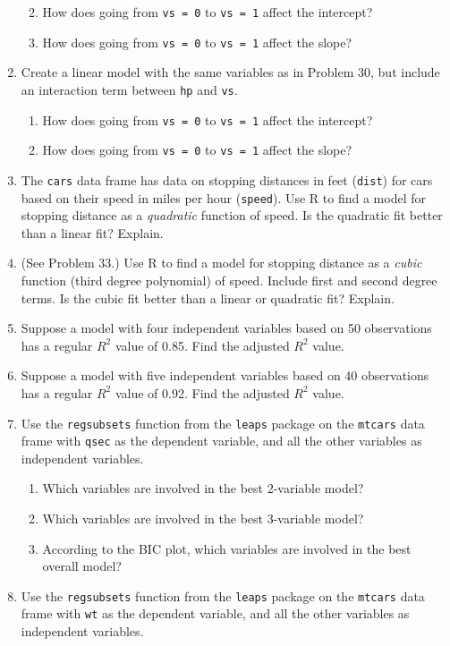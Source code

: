 \documentclass[
]{book}
\providecommand{\tightlist}{%
  \setlength{\itemsep}{0pt}\setlength{\parskip}{0pt}}
\theoremstyle{definition}
\theoremstyle{definition}
\theoremstyle{definition}
\theoremstyle{definition}
\theoremstyle{remark}
\begin{document}
\begin{enumerate}
  \begin{enumerate}
  \def\labelenumii{\alph{enumii}.}
  \tightlist
  \item
    How does going from \texttt{vs\ =\ 0} to \texttt{vs\ =\ 1} affect the intercept?
  \item
    How does going from \texttt{vs\ =\ 0} to \texttt{vs\ =\ 1} affect the slope?
  \end{enumerate}
\item
  Create a linear model with the same variables as in Problem 30, but include an interaction term between \texttt{hp} and \texttt{vs}.

  \begin{enumerate}
  \def\labelenumii{\alph{enumii}.}
  \tightlist
  \item
    How does going from \texttt{vs\ =\ 0} to \texttt{vs\ =\ 1} affect the intercept?
  \item
    How does going from \texttt{vs\ =\ 0} to \texttt{vs\ =\ 1} affect the slope?
  \end{enumerate}
\item
  The \texttt{cars} data frame has data on stopping distances in feet (\texttt{dist}) for cars based on their speed in miles per hour (\texttt{speed}). Use R to find a model for stopping distance as a \emph{quadratic} function of speed. Is the quadratic fit better than a linear fit? Explain.
\item
  (See Problem 33.) Use R to find a model for stopping distance as a \emph{cubic} function (third degree polynomial) of speed. Include first and second degree terms. Is the cubic fit better than a linear or quadratic fit? Explain.
\item
  Suppose a model with four independent variables based on 50 observations has a regular \(R^2\) value of 0.85. Find the adjusted \(R^2\) value.
\item
  Suppose a model with five independent variables based on 40 observations has a regular \(R^2\) value of 0.92. Find the adjusted \(R^2\) value.
\item
  Use the \texttt{regsubsets} function from the \texttt{leaps} package on the \texttt{mtcars} data frame with \texttt{qsec} as the dependent variable, and all the other variables as independent variables.

  \begin{enumerate}
  \def\labelenumii{\alph{enumii}.}
  \tightlist
  \item
    Which variables are involved in the best 2-variable model?
  \item
    Which variables are involved in the best 3-variable model?
  \item
    According to the BIC plot, which variables are involved in the best overall model?
  \end{enumerate}
\item
  Use the \texttt{regsubsets} function from the \texttt{leaps} package on the \texttt{mtcars} data frame with \texttt{wt} as the dependent variable, and all the other variables as independent variables.


\end{enumerate}
\end{document}
